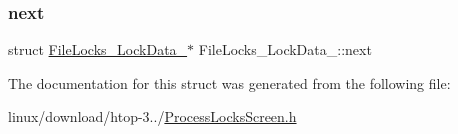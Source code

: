 \subsubsection{\texorpdfstring{next}{next}}
{\footnotesize\ttfamily struct \hyperlink{structFileLocks__LockData__}{File\+Locks\+\_\+\+Lock\+Data\+\_\+}$\ast$ File\+Locks\+\_\+\+Lock\+Data\+\_\+\+::next}



The documentation for this struct was generated from the following file\+:\begin{DoxyCompactItemize}
\item 
linux/download/htop-\/3../\hyperlink{ProcessLocksScreen_8h}{Process\+Locks\+Screen.\+h}\end{DoxyCompactItemize}

